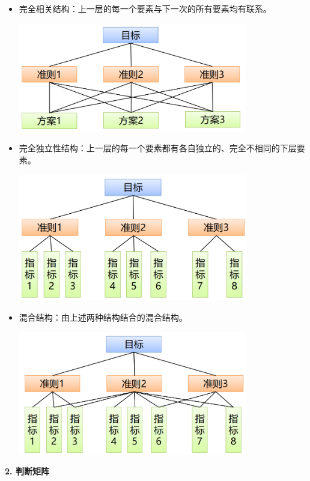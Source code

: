 \documentclass[a4paper,12pt]{article}
\begin{document}
\begin{itemize}[itemsep=0pt,parsep=0pt]
    \item 完全相关结构：上一层的每一个要素与下一次的所有要素均有联系。
    \begin{center}
        \includegraphics[width=10cm]{完全相关结构.png}
    \end{center}
    \item 完全独立性结构：上一层的每一个要素都有各自独立的、完全不相同的下层要素。
    \begin{center}
        \includegraphics[width=10cm]{完全独立性结构.png}
    \end{center}
    \item 混合结构：由上述两种结构结合的混合结构。
    \begin{center}
        \includegraphics[width=10cm]{混合结构.png}
    \end{center}
\end{itemize}

\noindent
\textbf{2. 判断矩阵}
\end{document}
